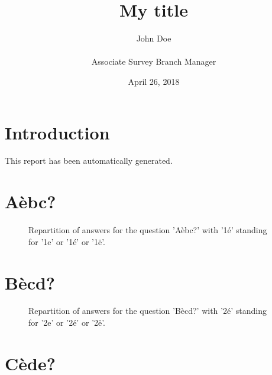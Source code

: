 \documentclass[11pt]{article}
\date{April 26, 2018}
\title{My title}
\author{John Doe\\\\Associate Survey Branch Manager}
\begin{document}
\maketitle{}
\section*{Introduction}
This report has been automatically generated.


\clearpage{}
\section{Aèbc?}

\label{sec:9}


\begin{figure}[h!]
    \caption{\label{figure:q9-1}Repartition of answers for the question 'Aèbc?' with '1é' standing for '1e' or '1é' or '1ë'.}
\end{figure}



\clearpage{}
\section{Bècd?}

\label{sec:10}


\begin{figure}[h!]
    \caption{\label{figure:q10-1}Repartition of answers for the question 'Bècd?' with '2é' standing for '2e' or '2é' or '2ë'.}
\end{figure}



\clearpage{}
\section{Cède?}

\label{sec:11}
\end{document}

